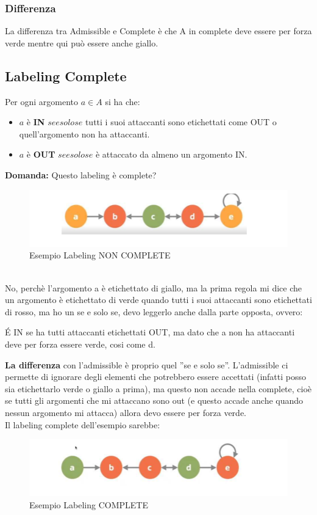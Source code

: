 \subsubsection{\textbf{Differenza}}
La differenza tra Admissible e Complete è che A in complete deve essere per forza verde mentre qui può essere anche giallo.
\newpage
\subsection{Labeling Complete}
Per ogni argomento $a \in A$ si ha che:
\begin{itemize}
    \item  $a$ è \textbf{IN} $se e solo se$ tutti i suoi attaccanti sono etichettati come OUT o quell’argomento non ha attaccanti.
    \item $a$ è \textbf{OUT} $se e solo se$ è attaccato da almeno un argomento IN.
\end{itemize}
\textbf{Domanda: } Questo labeling è complete?
\begin{figure}[htp]
	\centering
    \includegraphics[width=12cm, keepaspectratio]{img/Cap7/LC.png}
    \caption{Esempio Labeling NON COMPLETE}
\end{figure}
\\No, perchè l’argomento a è etichettato di giallo, ma la prima regola mi dice che un argomento è etichettato di verde quando tutti i suoi attaccanti sono etichettati di rosso, ma ho un se e solo se, devo leggerlo anche dalla parte opposta, ovvero:

\vspace{0.3cm}
\noindent É IN se ha tutti attaccanti etichettati OUT, ma dato che a non ha attaccanti deve per forza essere verde, cosi come d.

\vspace{0.3cm}

\noindent \textbf{La differenza} con l’admissible è proprio quel ”se e solo se”. L’admissible ci permette di ignorare degli elementi che potrebbero essere accettati (infatti posso sia etichettarlo verde o giallo a prima), ma questo non accade nella complete, cioè se tutti gli argomenti che mi attaccano sono out (e questo
accade anche quando nessun argomento mi attacca) allora devo essere per forza verde. 
\\
Il labeling complete dell’esempio sarebbe:
\begin{figure}[htp]
	\centering
    \includegraphics[width=12cm, keepaspectratio]{img/Cap7/LC2.png}
    \caption{Esempio Labeling COMPLETE}
\end{figure}

